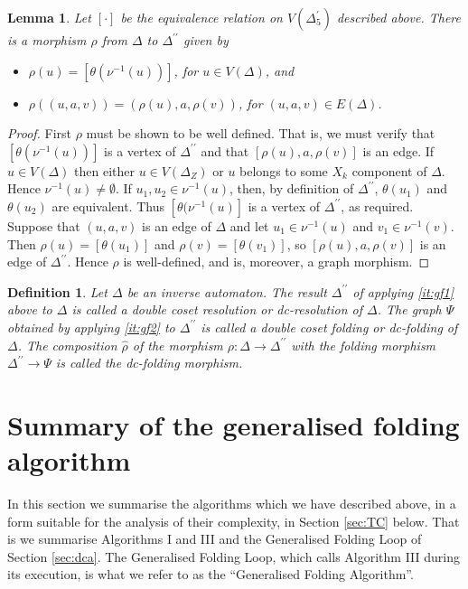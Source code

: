 \documentclass[a4paper,12pt]{article}
\newcommand{\D}{\Delta }
\renewcommand{\S}{\Sigma }
\newcommand{\nul}{\emptyset }
\newtheorem{lemma}[theorem]{Lemma}
\newtheorem{definition}[theorem]{Definition}
\numberwithin{equation}{section}
\numberwithin{figure}{section}
\newcommand{\maps}{\rightarrow}
\begin{document}
\begin{lemma}\label{lem:resol-quot}
Let $[\cdot]$ be the equivalence relation on $V(\D^\prime_5)$
described above. There is a morphism $\rho$ from  $\D$ to
$\D^{\prime\prime}$ given by
\begin{itemize}
\item
$\rho(u)=[\theta(\nu^{-1}(u))]$, for
$u\in V(\D)$, and
\item
$\rho((u,a,v))=(\rho(u),a,\rho(v))$, for $(u,a,v)\in  E(\D)$.
\end{itemize}
\end{lemma}
\begin{proof}
First $\rho$ must be shown to be well defined.
That is, we must verify that $[\theta(\nu^{-1}(u))]$ is a vertex of
$\D^{\prime\prime}$ and that $[\rho(u),a,\rho(v)]$ is an edge.
If $u \in V(\D)$
then either $u\in V(\D_Z)$ or  $u$ belongs to
some $X_k$ component of $\D$. Hence
 $\nu^{-1}(u)\neq \nul$. If $u_1, u_2\in \nu^{-1}(u)$, then,
by definition of
$\D^{\prime\prime}$, $\theta(u_1)$ and $\theta(u_2)$ are equivalent.
Thus $[\theta(\nu^{-1}(u)]$ is a vertex of $\D^{\prime\prime}$,
as required.
 Suppose that $(u,a,v)$ is an edge
of $\D$ and let $u_1\in \nu^{-1}(u)$ and $v_1\in \nu^{-1}(v)$. Then
$\rho(u)=[\theta(u_1)]$ and $\rho(v)=[\theta(v_1)]$, so
$[\rho(u), a, \rho(v)]$ is an edge of $\D^{\prime\prime}$.
Hence $\rho$ is well-defined, and is, moreover, a graph morphism.
\end{proof}


\begin{definition}
Let $\D$ be an inverse automaton.
 The result $\D^{\prime\prime}$ of applying  \ref{it:gf1}
above to $\D$ is called a \emph{double coset resolution} or
\emph{dc-resolution} of $\D$. The graph $\Psi$ obtained by applying
 \ref{it:gf2} to $\D^{\prime\prime}$ is called a \emph{double
coset folding} or \emph{dc-folding} of $\D$.  The composition $\hat\rho$ of
the  morphism
$\rho:\D\maps \D^{\prime\prime}$ with the folding morphism $\D^{\prime\prime}\maps
\Psi$ is called the \emph{dc-folding morphism}.
\end{definition}
\section{Summary of the generalised folding algorithm}
In this section we summarise the algorithms which we have described above,
in a form suitable for the analysis of their complexity,
in Section \ref{sec:TC} below. That is we summarise Algorithms I and III
and the Generalised Folding Loop of Section \ref{sec:dca}. The Generalised Folding Loop, which calls Algorithm III
during its execution, is what we refer to as the ``Generalised Folding
Algorithm''.
\end{document}
